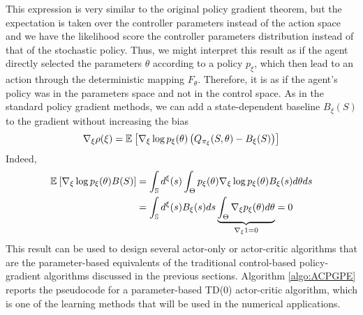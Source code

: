 This expression is very similar to the original policy gradient theorem, but
the expectation is taken over the controller parameters instead of the action space and we have the likelihood score the controller parameters distribution instead of that of the stochastic policy. Thus, we might interpret this result as if the agent directly selected the parameters $\theta$ according to a policy $p_\xi$, which then lead to an action through the deterministic mapping $F_\theta$. Therefore, it is as if the agent's policy was in the parameters space and not in the control space. As in the standard policy gradient methods, we can add a state-dependent baseline $B_\xi(S)$ to the gradient without increasing the bias
\begin{equation}
	\nabla_\xi \rho(\xi) = \mathbb{E}_{}\left[ \nabla_\xi \log p_\xi(\theta) \left(Q_{\pi_\xi}(S,
						\theta) - B_\xi(S)\right) \right]
\end{equation}
Indeed, 
\begin{equation*}
	\begin{split}
		\mathbb{E}_{}\left[ \nabla_\xi \log p_\xi(\theta) B(S) \right] 
			&= \int_{\mathbb{S}} d^\xi(s) \int_\Theta p_\xi(\theta) \nabla_\xi \log
		p_\xi(\theta) B_\xi(s) d\theta ds\\
		&= \int_{\mathbb{S}} d^\xi(s) B_\xi(s) ds \underbrace{\int_\Theta \nabla_\xi p_\xi(\theta)
	d\theta}_{\nabla_\xi 1 = 0} = 0
	\end{split}
\end{equation*}
This result can be used to design several actor-only or actor-critic algorithms that are the parameter-based equivalents of the traditional control-based policy-gradient algorithms discussed in the previous sections. Algorithm \ref{algo:ACPGPE} reports the pseudocode for a parameter-based TD(0) actor-critic algorithm, which is one of the learning methods that will be used in the numerical applications. 

